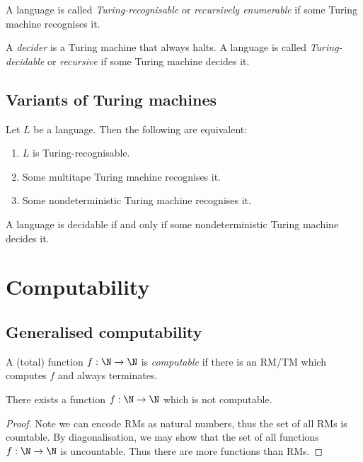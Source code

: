 \documentclass{article}
\begin{document}
\begin{definition}[Sipser p. 170]
    A language is called \emph{Turing-recognisable} or \emph{recursively enumerable}
    if some Turing machine recognises it.
\end{definition}

\begin{definition}[Sipser p. 170]
    A \emph{decider} is a Turing machine that always halts. A language is called
    \emph{Turing-decidable} or \emph{recursive} if some Turing machine decides it.
\end{definition}

\subsection{Variants of Turing machines}

\begin{theorem}[Sipser p. 176-180]
    Let $L$ be a language. Then the following are equivalent:
    \begin{enumerate}
        \item $L$ is Turing-recognisable.
        \item Some multitape Turing machine recognises it.
        \item Some nondeterministic Turing machine recognises it.
    \end{enumerate}
\end{theorem}

\begin{corollary}[Sipser p. 180]
    A language is decidable if and only if some nondeterministic Turing machine
    decides it.
\end{corollary}

\section{Computability}

\subsection{Generalised computability}

\begin{definition}
    A (total) function $f:\N\to\N$ is \emph{computable} if there is an RM/TM which 
    computes $f$ and always terminates.
\end{definition}

\begin{theorem}
    There exists a function $f:\N\to\N$ which is not computable.
    \begin{proof}
        Note we can encode RMs as natural numbers, thus the set of all RMs is countable.
        By diagonalisation, we may show that the set of all functions $f:\N\to\N$ is 
        uncountable. Thus there are more functions than RMs.
    \end{proof}
\end{theorem}
\end{document}
